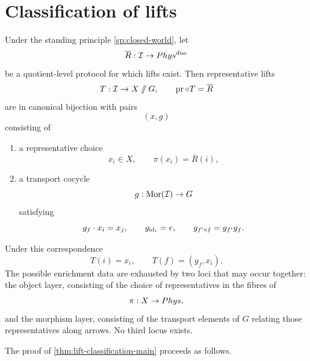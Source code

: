 \section{Classification of lifts}
\label{sec:lift-classification}
\begin{theorem}
	\label{thm:lift-classification-main}
	Under the standing principle \cref{sp:closed-world}, let
	\[
		\overline R:\mathcal I\to Phys^{\mathrm{disc}}
	\]
	be a quotient-level protocol for which lifts exist.
	Then representative lifts
	\[
		T:\mathcal I\to X\mathbin{/\mkern-6mu/} G,
		\qquad
		\operatorname{pr}\circ T=\overline R
	\]
	are in canonical bijection with pairs
	\[
		(x,g)
	\]
	consisting of
	\begin{enumerate}[label=\textup{(\roman*)}]
		\item a representative choice
		      \[
			      x_i\in X,
			      \qquad
			      \pi(x_i)=\overline R(i),
		      \]
		\item a transport cocycle
		      \[
			      g:\mathrm{Mor}(\mathcal I)\to G
		      \]
		      satisfying
		      \[
			      g_f\cdot x_i=x_j,
			      \qquad
			      g_{\operatorname{id}_i}=e,
			      \qquad
			      g_{f'\circ f}=g_{f'}g_f .
		      \]
	\end{enumerate}
	Under this correspondence
	\[
		T(i)=x_i,
		\qquad
		T(f)=(g_f,x_i).
	\]
	The possible enrichment data are exhausted by two loci that may occur
	together: the object layer, consisting of the choice of
	representatives in the fibres of
	\[
		\pi:X\to Phys,
	\]
	and the morphism layer, consisting of the transport elements of \(G\)
	relating those representatives along arrows. No third locus exists.
\end{theorem}
The proof of \cref{thm:lift-classification-main} proceeds as follows.
